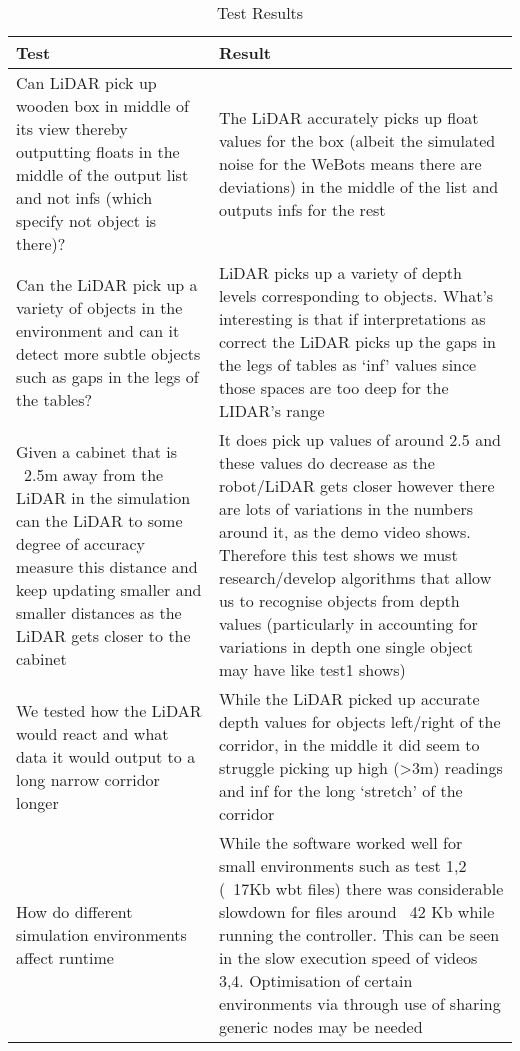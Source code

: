 \documentclass{article}
\begin{document}
\begin{table*}[h]
\vskip 3mm
\begin{center}

\begin{small}

\begin{tabular}{|p{8.32cm}|p{8.35cm}|}
\hline\hline
\abovespace\belowspace
Test & Result    \\
\hline\hline
\abovespace
Can LiDAR pick up wooden box in middle of its
view thereby outputting floats in the middle of the output list and not infs (which specify not object is
there)?
& The LiDAR accurately picks up float values for the box (albeit the simulated noise for the WeBots means there are deviations) in the middle of the list and outputs infs for the rest  
 \belowspace\\
\hline
\abovespace
Can the LiDAR pick up a variety of objects in the environment and can it detect more subtle objects such as gaps in the legs of the tables?
 & LiDAR picks up a variety of depth levels
corresponding to objects. What’s interesting is that if interpretations as correct the LiDAR picks up the gaps in the legs of tables as ‘inf’ values since those spaces are too deep for the LIDAR’s range
\belowspace \\
\hline
\abovespace
Given a cabinet that is ~2.5m away from the LiDAR in the simulation can the LiDAR to some degree of accuracy measure this distance and keep updating smaller and smaller distances as the LiDAR gets closer to the cabinet
& It does pick up values of around 2.5 and these values do decrease as the robot/LiDAR gets closer however there are lots of variations in the numbers around it, as the demo video shows. Therefore this test shows we must research/develop algorithms that allow us to recognise objects from depth values (particularly in accounting for variations in
depth one single object may have like test1 shows)
 \belowspace \\
\hline
\abovespace
We tested how the LiDAR would react and what data it would output to a long narrow corridor longer
 & While the LiDAR picked up accurate depth values
for objects left/right of the corridor, in the middle it
did seem to struggle picking up high (>3m) readings
and inf for the long ‘stretch’ of the corridor
\belowspace \\
\hline
\abovespace
How do different simulation environments affect runtime
 & While the software worked well for small
environments such as test 1,2 (~17Kb wbt files)
there was considerable slowdown for files around
~42 Kb while running the controller. This can be
seen in the slow execution speed of videos 3,4.
Optimisation of certain environments via through
use of sharing generic nodes may be needed
\belowspace \\
\hline


\end{tabular}

\end{small}
\caption{Test Results}
\label{tab:sample-table}

\end{center}

\vskip -3mm
\end{table*}
\end{document}
